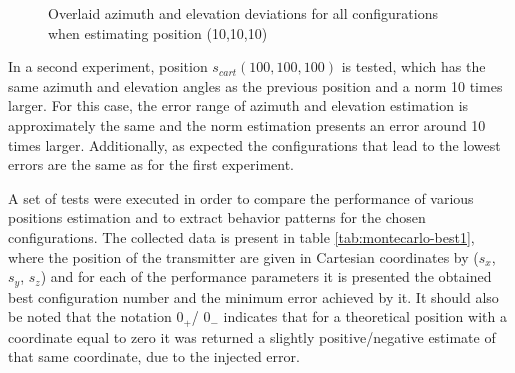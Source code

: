 \begin{figure}[!htbp]
	\captionsetup{justification=centering,margin=2cm}
	\caption{Overlaid azimuth and elevation deviations for all configurations when estimating position (10,10,10)}
	\label{fig:both-101010}
\end{figure}

In a second experiment, position $s_{cart}(100,100,100)$ is tested, which has the same azimuth and elevation angles as the previous position and a norm 10 times larger. For this case, the error range of azimuth and elevation estimation is approximately the same and the norm estimation presents an error around 10 times larger. Additionally, as expected the configurations that lead to the lowest errors are the same as for the first experiment.

A set of tests were executed in order to compare the performance of various positions estimation and to extract behavior patterns for the chosen configurations. The collected data is present in table \ref{tab:montecarlo-best1}, where the position of the transmitter are given in Cartesian coordinates by ($s_x$, $s_y$, $s_z$) and for each of the performance parameters it is presented the obtained best configuration number and the minimum error achieved by it. It should also be noted that the notation $0_{+}$/ $0_{-}$ indicates that for a theoretical position with a coordinate equal to zero it was returned a slightly positive/negative estimate of that same coordinate, due to the injected error.

